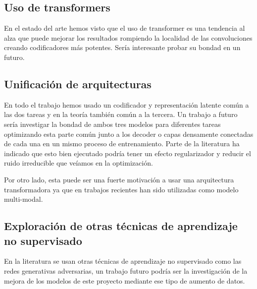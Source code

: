 \subsection{Uso de transformers}

En el estado del arte hemos visto que el uso de transformer es una tendencia al alza que puede mejorar los resultados rompiendo la localidad de las convoluciones creando codificadores más potentes. Sería interesante probar su bondad en un futuro.  

\subsection{Unificación de arquitecturas}

En todo el trabajo hemos usado un codificador y representación latente común a las dos tareas y en la teoría también común a la tercera. Un trabajo a futuro sería investigar la bondad de ambos tres modelos para diferentes tareas optimizando esta parte común junto a los decoder o capas densamente conectadas de cada una en un mismo proceso de entrenamiento. Parte de la literatura ha indicado que esto bien ejecutado podría tener un efecto regularizador y reducir el ruido irreducible que veíamos en la optimización.

Por otro lado, esta puede ser una fuerte motivación a usar una arquitectura transformadora ya que en trabajos recientes han sido utilizadas como modelo multi-modal.

\subsection{Exploración de otras técnicas de aprendizaje no supervisado}

En la literatura se usan otras técnicas de aprendizaje no supervisado como las redes generativas adversarias, un trabajo futuro podría ser la investigación de la mejora de los modelos de este proyecto mediante ese tipo de aumento de datos.
